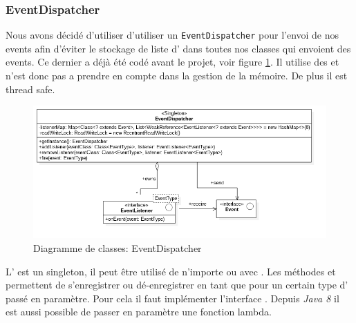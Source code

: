 \documentclass[report, backcover, french, nodocumentinfo]{upmethodology-document}
\begin{document}
			\subsubsection{EventDispatcher}
				\p{}
					Nous avons décidé d'utiliser d'utiliser un \texttt{EventDispatcher} pour l'envoi de nos events afin d'éviter le stockage de liste d' dans toutes nos classes qui envoient des events. Ce dernier a déjà été codé avant le projet, voir figure \ref{fig:EventDispatcherClassDiagram}. Il utilise des  et n'est donc pas a prendre en compte dans la gestion de la mémoire. De plus il est thread safe.
					\begin{figure}[h!]
						\centering
						\includegraphics[width=\textwidth]{figures/EventDispatcherClassDiagram}
						\caption{Diagramme de classes: EventDispatcher}
						\label{fig:EventDispatcherClassDiagram}
					\end{figure}
					L' est un singleton, il peut être utilisé de n'importe ou avec . Les méthodes  et  permettent de s'enregistrer ou dé-enregistrer en tant que  pour un certain type d' passé en paramètre. Pour cela il faut implémenter l'interface . Depuis \textit{Java 8} il est aussi possible de passer en paramètre une fonction lambda.
\end{document}

